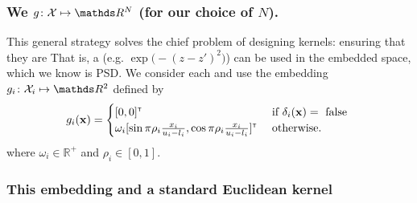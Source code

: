 \documentclass[12pt,onlymath]{beamer}
\begin{document}
\begin{frame}\frametitle{We  $\embeddingletter\colon \sX \mapsto \reals^N$ (for our choice of $N$).}

This general strategy solves the chief problem of designing kernels: ensuring that they are 
\vfill
That is, a  (e.g. $\exp\bigl(-(z - z')^2) $) can be used in the embedded space, which we know is PSD. 
\vfill
We consider each  and use the embedding $\embeddingletter_i\colon \sX_i \mapsto \reals^2$ defined by
%
%
%
\begin{align*}
g_i(\mathbf{x}) = 
	\begin{cases}
	[0,0]^{\textnormal{\tiny{\sf{T}}}} & \textrm{ if } \delta_i(\mathbf{x}) = \textrm{ false }\\
	\omega_i [\sin{\pi\rho_i\frac{x_i}{u_i-l_i}}, \cos{\pi\rho_i\frac{x_i}{u_i-l_i}}]^{\textnormal{\tiny{\sf{T}}}} & \textrm{ otherwise.}
	\end{cases}
\end{align*}
where $\omega_i \in \mathbb{R}^+$ and $\rho_i \in [0,1]$.

\end{frame}


%
\begin{frame}\frametitle{This embedding and a standard Euclidean kernel  }
\begin{figure}

	{\hspace{-1cm}}
\vspace{-0.3cm}
\end{figure}
\label{fig:cylinder}

\end{frame}
\end{document}
